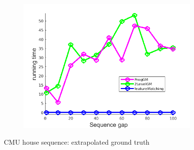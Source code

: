 \documentclass[
	fontsize=12pt,
	paper=a4,
	twoside=false,
	numbers=noenddot,
	plainheadsepline,
	toc=listof,
	toc=bibliography
]{scrartcl}
\begin{document}
\begin{figure}[h]
\begin{subfigure}[b]{0.3\textwidth}
	\end{subfigure} 
	\begin{subfigure}[b]{0.3\textwidth}
		\centering
		\includegraphics[scale=0.25]{"fig_ver2608/RealImages/HouseSeq/anchor_descr/using_cpd_afftrafo/solution/performance/time"}  
	\end{subfigure} 	
	\caption{CMU house sequence: extrapolated ground truth}
\end{figure}
\FloatBarrier
\vspace{-20pt}
\end{document}
